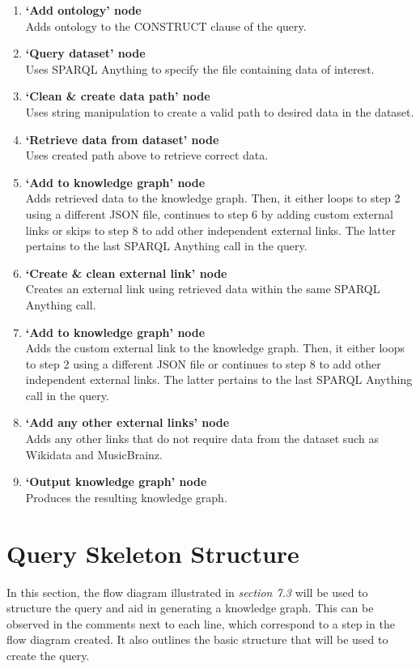 \begin{enumerate}
  \item \textbf{`Add ontology' node} \\ Adds ontology to the CONSTRUCT clause of the query.
  \item \textbf{`Query dataset' node} \\ Uses SPARQL Anything to specify the file containing data of interest.
  \item \textbf{`Clean \& create data path' node} \\ Uses string manipulation to create a valid path to desired data in the dataset. 
  \item \textbf{`Retrieve data from dataset' node} \\ Uses created path above to retrieve correct data.
  \item \textbf{`Add to knowledge graph' node} \\ Adds retrieved data to the knowledge graph. Then, it either loops to step 2 using a different JSON file, continues to step 6 by adding custom external links or skips to step 8 to add other independent external links. The latter pertains to the last SPARQL Anything call in the query. 
  \item \textbf{`Create \& clean external link' node} \\ Creates an external link using retrieved data within the same SPARQL Anything call.
  \item \textbf{`Add to knowledge graph' node} \\ Adds the custom external link to the knowledge graph. Then, it either loops to step 2 using a different JSON file or continues to step 8 to add other independent external links. The latter pertains to the last SPARQL Anything call in the query. 
  \item \textbf{`Add any other external links' node} \\ Adds any other links that do not require data from the dataset such as Wikidata and MusicBrainz.
  \item \textbf{`Output knowledge graph' node} \\ Produces the resulting knowledge graph.
\end{enumerate}

\section{Query Skeleton Structure}
\hspace{0.5cm} In this section, the flow diagram illustrated in \textit{section 7.3} will be used to structure the query and aid in generating a knowledge graph. This can be observed in the comments next to each line, which correspond to a step in the flow diagram created. It also outlines the basic structure that will be used to create the query.

